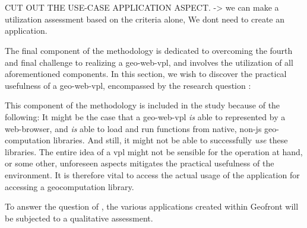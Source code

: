 
\section{\mySubRQFourTitle} 
\label{sec:method-four}

\begin{note}
  CUT OUT THE USE-CASE APPLICATION ASPECT. 
  -> we can make a utilization assessment based on the criteria alone, We dont need to create an application.
\end{note}

The final component of the methodology is dedicated to overcoming the fourth and final challenge to realizing a \ac{geo-web-vpl}, and involves the utilization of all aforementioned components. 
In this section, we wish to discover the practical usefulness of a \ac{geo-web-vpl}, encompassed by the research question : \mySubRQFour


This component of the methodology is included in the study because of the following: 
It might be the case that a geo-web-vpl \emph{is} able to represented by a web-browser, and \emph{is} able to load and run functions from native, non-js geo-computation libraries. 
And still, it might not be able to successfully \emph{use} these libraries. 
The entire idea of a vpl might not be sensible for the operation at hand, or some other, unforeseen aspects mitigates the practical usefulness of the environment. 
It is therefore vital to access the actual usage of the application for accessing a geocomputation library.

To answer the question of \mySubRQFourTitle, the various applications created within Geofront will be subjected to a qualitative assessment. 


